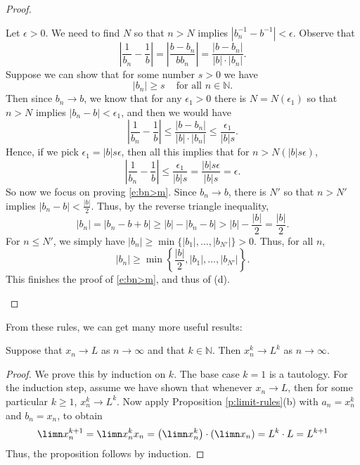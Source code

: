 \documentclass[11pt,dvipsnames]{book}
\numberwithin{figure}{section} %
\numberwithin{table}{section} %
\begin{document}
\begin{proof}
\begin{enumerate}[label=(\alph*)]
Let $\epsilon>0$. We need to find $N$ so that $n > N$ implies $|b_{n}^{-1}-b^{-1}|<\epsilon$. Observe that
\[
\left|\frac{1}{b_{n}}-\frac{1}{b}\right|
=\left|\frac{b-b_{n}}{bb_{n}}\right|
=\frac{|b-b_{n}|}{|b|\cdot |b_{n}|}.
\]
Suppose we can show that for some number $s>0$ we have
\begin{equation}
\label{e:bn>m}
|b_{n}|\geq s \;\;\; \mbox{ for all }n\in\mathbb{N}.
\end{equation}
 Then since $b_{n}\rightarrow b$, we know that for any $\epsilon_1>0$ there is $N = N(\epsilon_1)$ so that $n > N$ implies $|b_{n}-b|<\epsilon_1$, and then we would have
\[
\left|\frac{1}{b_{n}}-\frac{1}{b}\right|\leq \frac{|b-b_{n}|}{|b|\cdot |b_{n}|}
\leq \frac{\epsilon_1}{|b| s}.
\]
Hence, if we pick $\epsilon_1=|b|s\epsilon$, then all this implies that for $n > N(|b|s\epsilon)$,
\[
\left|\frac{1}{b_{n}}-\frac{1}{b}\right|
\leq \frac{\epsilon_1}{|b| s}= \frac{|b|s\epsilon}{|b| s}=\epsilon.
\]
So now we focus on proving \eqref{e:bn>m}. Since $b_n\rightarrow b$, there is $N'$ so that $n > N'$ implies $|b_{n}-b|<\frac{|b|}{2}$. Thus, by the reverse triangle inequality,
\[
|b_{n}|
=|b_{n}-b+b|
\geq |b|-|b_{n}-b|
>|b|-\frac{|b|}{2} = \frac{|b|}{2}.
\]
For $n \leq N'$, we simply have $|b_{n}|\geq \min\{|b_{1}|,\dots,|b_{N'}|\}>0$. Thus, for all $n$,
 \[
|b_{n}|\geq \min\left\{\frac{|b|}{2},|b_{1}|,\dots ,|b_{N'}|\right\}.
\]
This finishes the proof of  \eqref{e:bn>m}, and thus of (d).

\end{enumerate}
\end{proof}

From these rules, we can get many more useful results:

\begin{proposition}
\label{p:power-lim}
Suppose that $x_n\rightarrow L$ as $n \to \infty$ and that $k \in \mathbb{N}$. Then $x_{n}^{k}\rightarrow L^{k}$ as $n \to \infty$.
\end{proposition}

\begin{proof}
We prove this by induction on $k$. The base case $k=1$ is a tautology. For the induction step, assume we have shown that whenever $x_n\rightarrow L$, then for some particular $k \geq 1$, $x_{n}^{k}\rightarrow L^{k}$. Now apply Proposition \ref{p:limit-rules}(b) with $a_n=x_{n}^{k}$ and $b_{n}=x_{n}$, to obtain
\[
\limn x_{n}^{k+1}=\limn x_{n}^{k}x_{n}
=\left(\limn x_{n}^{k}\right)\cdot\left(\limn x_{n}\right)
=L^{k}\cdot L = L^{k+1}
\] Thus, the proposition follows by induction.
\end{proof}
\end{document}
